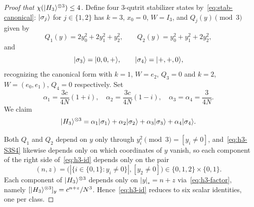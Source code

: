 \documentclass[11pt]{article}
\theoremstyle{definition}
\newcommand{\microspace}{\mspace{0.5mu}}
\newcommand{\ket}[1]{\lvert\microspace #1 \microspace \rangle}
\newcommand{\chiR}{\chi}
\newcommand{\Hth}{\ket{H_3}}
\begin{document}
	\begin{proof}[Proof that $\chiR(\Hth^{\otimes 3}) \le 4$]
		Define four 3-qutrit stabilizer states by~\eqref{eq:stab-canonical}:
		$\ket{\sigma_j}$ for $j \in \{1, 2\}$ has $k = 3$, $x_0 = 0$, $W = I_3$, and
		$Q_j(y) \pmod 3$ given by
		\begin{equation}\label{eq:h3-Qs}
			Q_1(y) = 2 y_0^2 + 2 y_1^2 + y_2^2, \qquad
			Q_2(y) = y_0^2 + y_1^2 + 2 y_2^2,
		\end{equation}
		and
		\begin{equation}\label{eq:h3-S3S4}
			\ket{\sigma_3} = \ket{0, 0, +}, \qquad \ket{\sigma_4} = \ket{+, +, 0},
		\end{equation}
		recognizing the canonical form with $k = 1$, $W = e_2$, $Q_3 = 0$ and
		$k = 2$, $W = (e_0, e_1)$, $Q_4 = 0$ respectively. Set
		\begin{equation}\label{eq:h3-coeffs}
			\alpha_1 = \frac{3 c}{4 N}(1 + i), \quad
			\alpha_2 = \frac{3 c}{4 N}(1 - i), \quad
			\alpha_3 = \alpha_4 = \frac{3}{4 N}.
		\end{equation}
		We claim
		\begin{equation}\label{eq:h3-id}
			\Hth^{\otimes 3} = \alpha_1 \ket{\sigma_1} + \alpha_2 \ket{\sigma_2}
			+ \alpha_3 \ket{\sigma_3} + \alpha_4 \ket{\sigma_4}.
		\end{equation}
		
		Both $Q_1$ and $Q_2$ depend on $y$ only through $y_i^2 \pmod 3 = [y_i \ne 0]$,
		and~\eqref{eq:h3-S3S4} likewise depends only on which coordinates of
		$y$ vanish, so each component of the right side
		of~\eqref{eq:h3-id} depends only on the pair
		\begin{equation}
			(n, z) = \big( |\{ i \in \{0, 1\} : y_i \ne 0 \}|, [y_2 \ne 0] \big) \in \{0,1,2\} \times \{0,1\}.
		\end{equation}
		Each component of $\Hth^{\otimes 3}$ depends only on
		$|y|_* = n + z$ via~\eqref{eq:h3-factor}, namely
		$[\Hth^{\otimes 3}]_y = c^{n + z} / N^3$. Hence~\eqref{eq:h3-id}
		reduces to six scalar identities, one per class.
		

\end{proof}
\end{document}
